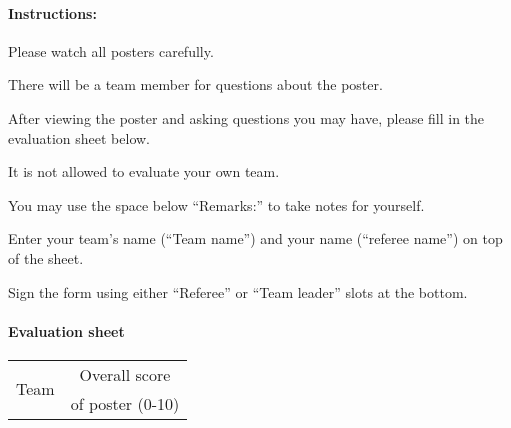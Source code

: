 \paragraph{Instructions:}
\begin{compactenum}
\item Please watch all posters carefully.
\item There will be a team member for questions about the poster.
\item After viewing the poster and asking questions you may have, please fill in the evaluation sheet below.
\item It is not allowed to evaluate your own team.
\item You may use the space below \enquote{Remarks:} to take notes for yourself.
\item Enter your team's name (\enquote{Team name}) and your name (\enquote{referee name}) on top of the sheet.
\item Sign the form using either \enquote{Referee} or \enquote{Team leader} slots at the bottom.
\end{compactenum}

\paragraph{Evaluation sheet}
\begin{center}
\begingroup
\newcommand\tableTEAMS{}
\def\do#1{\appto\tableTEAMS{#1 &  \\\hline}}%
\expandafter\docsvlist\expandafter{\TEAMSSTAGEONE}
\begin{tabular}{|l|c|}
  \hline
  \multirow{2}{*}{Team} & Overall score     \\
                        & of poster (0-10)  \\
  \hline
  \hline
  \tableTEAMS
\end{tabular}
\endgroup
\end{center}

